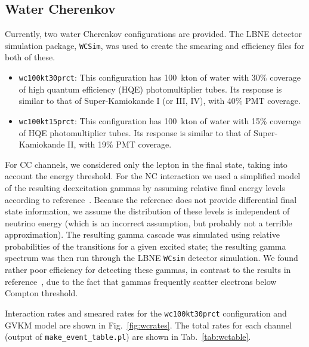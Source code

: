 \documentclass[12pt]{article}
\begin{document}
\subsection{Water Cherenkov}

Currently, two water Cherenkov configurations are provided.  The LBNE
detector simulation package, \texttt{WCSim}, was used to create the
smearing and efficiency files for both of these.

\begin{itemize}

\item \texttt{wc100kt30prct}:
This configuration has 100~kton of water with 30\% coverage of high quantum efficiency (HQE) photomultiplier tubes.  Its response is similar to that of Super-Kamiokande I (or III, IV), with 40\% PMT coverage.  

\item \texttt{wc100kt15prct}:
This configuration has 100~kton of water with 15\% coverage of HQE photomultiplier tubes.  Its response is similar to that of Super-Kamiokande II, with 19\% PMT coverage.  


\end{itemize}

For CC channels, we considered only the lepton in the final state,
taking into account the energy threshold.  For the NC interaction we
used a simplified model of the resulting deexcitation gammas by
assuming relative final energy levels according to
reference~\cite{Kolbe:2002gk}.  Because the reference does not provide
differential final state information, we assume the distribution of
these levels is independent of neutrino energy (which is an incorrect
assumption, but probably not a terrible approximation).  The resulting
gamma cascade was simulated using relative probabilities of the
transitions for a given excited state; the resulting gamma spectrum
was then run through the LBNE \texttt{WCsim} detector simulation.  We found rather poor
efficiency for detecting these gammas, in contrast to the results in
reference~\cite{Langanke:1995he}, due to the fact that gammas
frequently scatter electrons below Compton threshold.

Interaction rates and smeared rates for the \texttt{wc100kt30prct} configuration and GVKM model are shown in
Fig.~\ref{fig:wcrates}.  The total rates for each channel (output of \texttt{make\_event\_table.pl}) are shown in Tab.~\ref{tab:wctable}.
\end{document}
